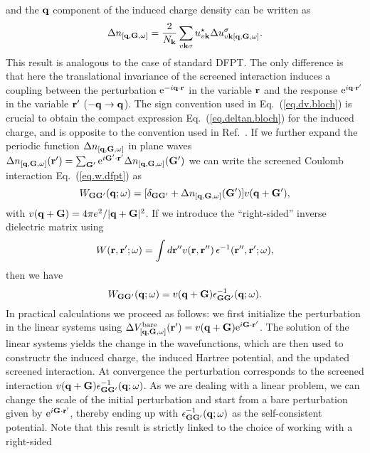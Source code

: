 \documentclass[twocolumn,prb,showpacs,superscriptaddress]{revtex4}
\def\w{\omega}
\def\q{{\bf q}}
\def\s{\sigma}
\def\k{{\bf k}}
\def\G{{\bf G}}
\def\Gp{{\bf G^\prime}}
\def\r{{\bf r}}
\def\rp{{\bf r^\prime}}
\def\rpp{{\bf r^{\prime\prime}}}
\begin{document}
and the $\q$ component of the induced charge density can be written as
  \begin{equation} \label{eq.deltan.bloch}
  \Delta n_{[\q,\G,\w]} = \frac{2}{N_\k}\sum_{v\k\s} u_{v\k}^\star  \Delta u^\s_{v\k[\q,\G,\w]}.
  \end{equation}
This result is analogous to the case of standard DFPT. The only difference is that
here the translational invariance of the screened interaction induces a coupling
between the perturbation ${\rm e}^{-i\q\cdot\r}$ in the variable $\r$ and the response
${\rm e}^{i\q\cdot\rp}$ in the variable $\rp$ ($-\q \rightarrow \q$).
The sign convention used in Eq.\ (\ref{eq.dv.bloch}) is crucial to obtain
the compact expression Eq.\ (\ref{eq.deltan.bloch}) for the induced charge,
and is opposite to the convention used in Ref.\ .
If we further expand the periodic function $\Delta n_{[\q,\G,\w]}$ in plane
waves $\Delta n_{[\q,\G,\w]}(\rp)=\sum_\Gp {\rm e}^{i\Gp\cdot\rp} \Delta n_{[\q,\G,\w]}(\Gp)$
we can write the screened Coulomb interaction Eq.\ (\ref{eq.w.dfpt}) as
  \begin{equation}
  W_{\G\Gp}(\q;\w) = [\delta_{\G\Gp} + \Delta n_{[\q,\G,\w]}(\Gp) ]v(\q+\Gp),
  \end{equation}
with $v(\q+\G) = 4\pi e^2/|\q+\G|^2$.
If we introduce the ``right-sided'' inverse dielectric matrix using
  \begin{equation}
  W(\r,\rp;\w) = \int d\rpp v(\r,\rpp) \, \epsilon^{-1}(\rpp,\rp;\w),
  \end{equation}
then we have
  \begin{equation}
  W_{\G\Gp}(\q;\w) = v(\q+\G)  \epsilon^{-1}_{\G\Gp}(\q;\w).
  \end{equation}
In practical calculations we proceed as follows: we first initialize the perturbation
in the linear systems using $\Delta V^{\rm bare}_{[\q,\G,\w]}(\rp) = v(\q+\G) {\rm e}^{i\G\cdot\rp}$.
The solution of the linear systems yields the change in the wavefunctions,
which are then used to constructr the induced charge, the induced Hartree potential,
and the updated screened interaction. At convergence the perturbation corresponds to
the screened interaction $v(\q+\G) \epsilon^{-1}_{\G\Gp}(\q;\w)$.
%
As we are dealing with a linear problem, we can change the scale of the initial
perturbation and start from a bare perturbation given by ${\rm e}^{i\G\cdot\rp}$,
thereby ending up with $\epsilon^{-1}_{\G\Gp}(\q;\w)$ as the self-consistent potential.
Note that this result is strictly linked to the choice of working with a right-sided 
\end{document}
